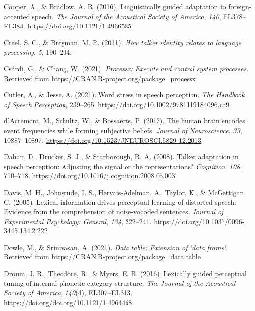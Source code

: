 \documentclass[
  11pt,
  english,
  man,floatsintext]{apa6}
\newlength{\cslhangindent}
\newlength{\cslentryspacingunit} %
\newenvironment{CSLReferences}[2] %
 {%
  \setlength{\parindent}{0pt}
  \ifodd #1
  \let\oldpar\par
  \def\par{\hangindent=\cslhangindent\oldpar}
  \fi
  \setlength{\parskip}{#2\cslentryspacingunit}
 }%
 {}
\begin{document}
\begin{CSLReferences}{1}{0}
\leavevmode{}%
Cooper, A., \& Bradlow, A. R. (2016). Linguistically guided adaptation to foreign-accented speech. \emph{The Journal of the Acoustical Society of America}, \emph{140}, EL378--EL384. \url{https://doi.org/10.1121/1.4966585}

\leavevmode{}%
Creel, S. C., \& Bregman, M. R. (2011). \emph{How talker identity relates to language processing}. \emph{5}, 190--204.

\leavevmode{}%
Csárdi, G., \& Chang, W. (2021). \emph{Processx: Execute and control system processes}. Retrieved from \url{https://CRAN.R-project.org/package=processx}

\leavevmode{}%
Cutler, A., \& Jesse, A. (2021). Word stress in speech perception. \emph{The Handbook of Speech Perception}, 239--265. \url{https://doi.org/10.1002/9781119184096.ch9}

\leavevmode{}%
d'Acremont, M., Schultz, W., \& Bossaerts, P. (2013). The human brain encodes event frequencies while forming subjective beliefs. \emph{Journal of Neuroscience}, \emph{33}, 10887--10897. \url{https://doi.org/10.1523/JNEUROSCI.5829-12.2013}

\leavevmode{}%
Dahan, D., Drucker, S. J., \& Scarborough, R. A. (2008). Talker adaptation in speech perception: Adjusting the signal or the representations? \emph{Cognition}, \emph{108}, 710--718. \url{https://doi.org/10.1016/j.cognition.2008.06.003}

\leavevmode{}%
Davis, M. H., Johnsrude, I. S., Hervais-Adelman, A., Taylor, K., \& McGettigan, C. (2005). Lexical information drives perceptual learning of distorted speech: Evidence from the comprehension of noise-vocoded sentences. \emph{Journal of Experimental Psychology: General}, \emph{134}, 222--241. \url{https://doi.org/10.1037/0096-3445.134.2.222}

\leavevmode{}%
Dowle, M., \& Srinivasan, A. (2021). \emph{Data.table: Extension of `data.frame`}. Retrieved from \url{https://CRAN.R-project.org/package=data.table}

\leavevmode{}%
Drouin, J. R., Theodore, R., \& Myers, E. B. (2016). Lexically guided perceptual tuning of internal phonetic category structure. \emph{The Journal of the Acoustical Society of America}, \emph{140}(4), EL307--EL313. \url{https://doi.org/doi.org/10.1121/1.4964468}


\end{CSLReferences}
\end{document}
